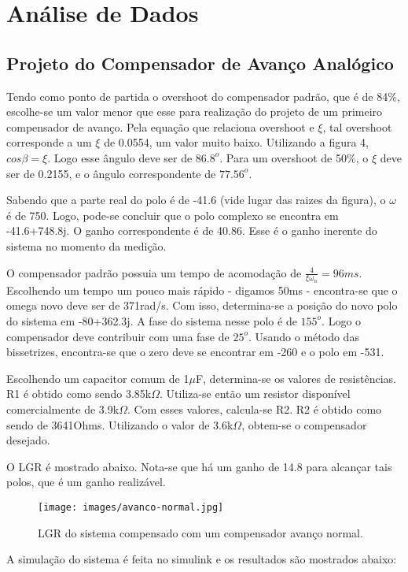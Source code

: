 \section{Análise de Dados}
\subsection{Projeto do Compensador de Avanço Analógico}
Tendo como ponto de partida o overshoot do compensador padrão, que é de 84\%, escolhe-se um valor menor que esse para realização do projeto de um primeiro compensador de avanço. Pela equação que relaciona overshoot e $\xi$, tal overshoot corresponde a um $\xi$ de 0.0554, um valor muito baixo. Utilizando a figura 4, $cos \beta=\xi$. Logo esse ângulo deve ser de $86.8^o$. Para um overshoot de 50\%, o $\xi$ deve ser de 0.2155, e o ângulo correspondente de $77.56^o$.

Sabendo que a parte real do polo é de -41.6 (vide lugar das raizes da figura), o $\omega$ é de 750. Logo, pode-se concluir que o polo complexo se encontra em -41.6+748.8j. O ganho correspondente é de 40.86. Esse é o ganho inerente do sistema no momento da medição.

O compensador padrão possuia um tempo de acomodação de $\frac{4}{\xi\omega_n}=96ms$. Escolhendo um tempo um pouco mais rápido - digamos 50ms - encontra-se que o omega novo deve ser de 371rad/s. Com isso, determina-se a posição do novo polo do sistema em -80+362.3j. A fase do sistema nesse polo é de $155^o$. Logo o compensador deve contribuir com uma fase de $25^o$. Usando o método das bissetrizes, encontra-se que o zero deve se encontrar em -260 e o polo em -531. 

Escolhendo um capacitor comum de 1$\mu$F, determina-se os valores de resistências. R1 é obtido como sendo 3.85k$\Omega$. Utiliza-se então um resistor disponível comercialmente de 3.9k$\Omega$. Com esses valores, calcula-se R2. R2 é obtido como sendo de 3641Ohms. Utilizando o valor de 3.6k$\Omega$, obtem-se o compensador desejado. 

O LGR é mostrado abaixo. Nota-se que há um ganho de 14.8 para alcançar tais polos, que é um ganho realizável.

\begin{figure}[H]
\centering
\texttt{[image: images/avanco-normal.jpg]}
\caption{LGR do sistema compensado com um compensador avanço normal.}
\label{fig:avanco_normal}
\end{figure}

A simulação do sistema é feita no simulink e os resultados são mostrados abaixo:

